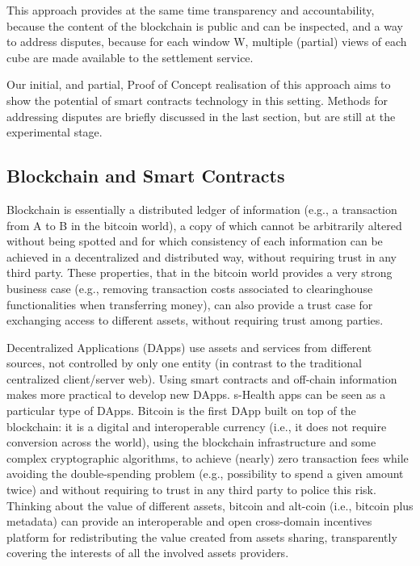 \documentclass[conference]{IEEEtran}
\begin{document}
This  approach provides at the same time transparency and accountability, because the content of the blockchain is public and can be inspected, and a way to address disputes, because for each window W, multiple (partial) views of each cube are made available to the settlement service.

Our initial, and partial, Proof of Concept realisation of this approach aims to show the potential of smart contracts technology in this setting. Methods for addressing disputes are briefly discussed in the last section, but are still at the experimental stage.


\subsection{Blockchain and Smart Contracts}


Blockchain is essentially a distributed ledger of information (e.g., a transaction from A to B in the bitcoin world), a copy of which cannot be arbitrarily altered without being spotted and for which consistency of each information can be achieved in a decentralized and distributed way, without requiring trust in any third party. These properties, that in the bitcoin world provides a very strong business case (e.g., removing transaction costs associated to clearinghouse functionalities when transferring money), can also provide a trust case for exchanging access to different assets, without requiring trust among parties.

Decentralized Applications (DApps) use assets and services from different sources, not controlled by only one entity (in contrast to the traditional centralized client/server web). Using smart contracts and off-chain information makes more practical to develop new DApps. s-Health apps can be seen as a particular type of DApps. Bitcoin is the first DApp built on top of the blockchain: it is a digital and interoperable currency (i.e., it does not require conversion across the world), using the blockchain infrastructure and some complex cryptographic algorithms, to achieve (nearly) zero transaction fees while avoiding the double-spending problem (e.g., possibility to spend a given amount twice) and without requiring to trust in any third party to police this risk. Thinking about the value of different assets, bitcoin and alt-coin (i.e., bitcoin plus metadata) can provide an interoperable and open cross-domain incentives platform for redistributing the value created from assets sharing, transparently covering the interests of all the involved assets providers.
\end{document}
